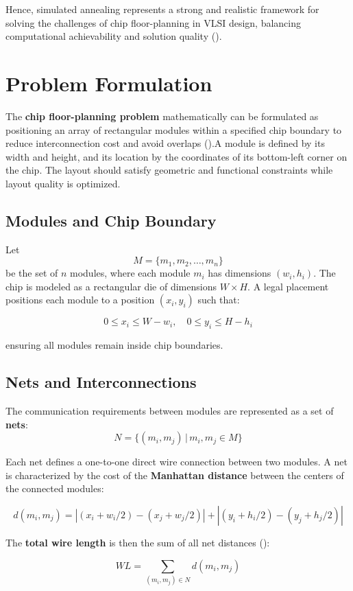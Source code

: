 \documentclass[9pt,a4paper,twoside]{rho-class/rho}
\begin{document}
Hence, simulated annealing represents a strong and realistic framework for solving the challenges of chip floor-planning in VLSI design, balancing computational achievability and solution quality  (\cite{parsac2024,sun2024}).  

\section{Problem Formulation}

The \textbf{chip floor-planning problem} mathematically can be formulated as positioning an array of rectangular modules within a specified chip boundary to reduce interconnection cost and avoid overlaps (\cite{chen2005,ictact2016}).A module is defined by its width and height, and its location by the coordinates of its bottom-left corner on the chip. The layout should satisfy geometric and functional constraints while layout quality is optimized.

\subsection{Modules and Chip Boundary}
Let
\[
M = \{m_1, m_2, \dots, m_n\}
\]
be the set of $n$ modules, where each module $m_i$ has dimensions $(w_i, h_i)$. The chip is modeled as a rectangular die of dimensions $W \times H$. A legal placement positions each module to a position $(x_i, y_i)$ such that:  

\[
0 \leq x_i \leq W - w_i, \quad 0 \leq y_i \leq H - h_i
\]

ensuring all modules remain inside chip boundaries.  

\subsection{Nets and Interconnections}
The communication requirements between modules are represented as a set of \textbf{nets}:  
\[
N = \{ (m_i, m_j) \,|\, m_i, m_j \in M \}
\]

Each net defines a one-to-one direct wire connection between two modules. A net is characterized by the cost of the  \textbf{Manhattan distance} between the centers of the connected modules:  

\[
d(m_i, m_j) = |(x_i + w_i/2) - (x_j + w_j/2)| + |(y_i + h_i/2) - (y_j + h_j/2)|
\]

The \textbf{total wire length} is then the sum of all net distances (\cite{chen2005}):  

\[
WL = \sum_{(m_i, m_j) \in N} d(m_i, m_j)
\]
\end{document}
